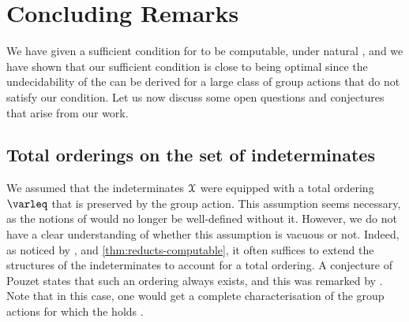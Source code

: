 %
\section{Concluding Remarks}
\label{sec:conclusion}

We have given a sufficient condition for  to be
computable, under natural , and we have shown
that our sufficient condition is close to being optimal since the
undecidability of the  can be derived
for a large class of group actions that do not satisfy our condition.
Let us now discuss some open questions and conjectures that arise from our work.

\subsection{Total orderings on the set of indeterminates} We assumed that the
indeterminates $\mathcal{X}$ were equipped with a total ordering $\varleq$ that is
preserved by the group action. This assumption seems necessary, as the notions
of  would no longer be well-defined without it. However,
we do not have a clear understanding of whether this assumption is vacuous or
not. Indeed, as noticed by \cite[Lemma 13]{GHOLAS24}, and
\cref{thm:reducts-computable}, it often suffices to extend the structures of
the indeterminates to account for a total ordering. A conjecture of Pouzet
\cite[Problems 12]{POUZ24} states that such an ordering always exists, and this
was remarked by \cite[Remark 14]{GHOLAS24}. Note that in this case, one would
get a complete characterisation of the group actions for which the
 holds \cite[Property 4]{GHOLAS24}.

